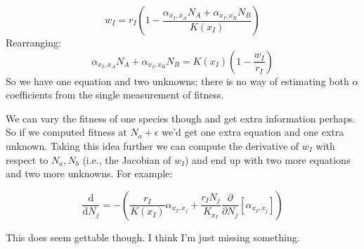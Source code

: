 \documentclass[10pt]{article}
\newcommand{\ud}{\ensuremath{\mathrm{d}}}
\begin{document}
\begin{equation*}
  w_I = r_I\left(1 - \frac{\alpha_{x_I, x_A} N_A + \alpha_{x_I, x_B} N_B}{K(x_I)}\right)
\end{equation*}
Rearranging:
\begin{equation*}
  \alpha_{x_I, x_A} N_A + \alpha_{x_I, x_B} N_B =
  K(x_I)\left(1 - \frac{w_I}{r_I}\right)
\end{equation*}
So we have one equation and two unknowns; there is no way of
estimating both $\alpha$ coefficients from the single measurement of
fitness.

We can vary the fitness of one species though and get extra
information perhaps.  So if we computed fitness at $N_a + \epsilon$ we'd
get one extra equation and one extra unknown.  Taking this idea
further we can compute the derivative of $w_I$ with respect to ${N_a,
  N_b}$ (i.e., the Jacobian of $w_I$) and end up with two more
equations and two more unknowns.  For example:

\begin{equation*}
  \frac{\ud}{\ud N_j} = - \left(\frac{r_I}{K(x_I)} \alpha_{x_I, x_j}
    + \frac{r_I N_j}{K_{x_I}}
    \frac{\partial}{\partial N_j}\left[ \alpha_{x_I, x_j} \right]\right)
\end{equation*}

This does seem gettable though.  I think I'm just missing something.
\end{document}
